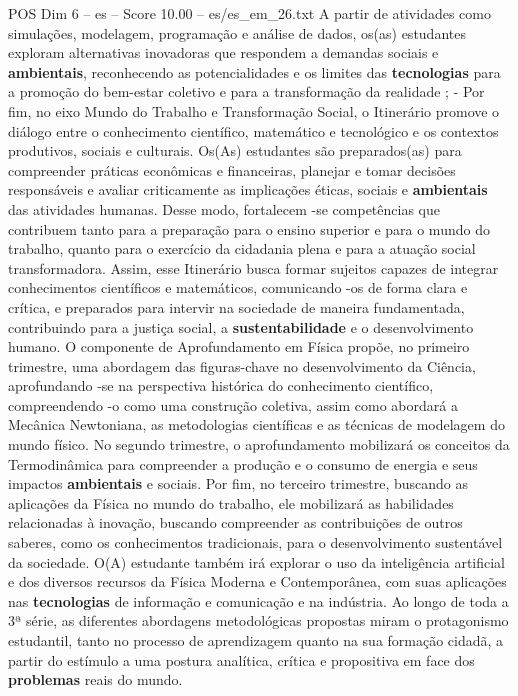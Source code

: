 \begin{textsample}{POS Dim 6 – es – Score 10.00 – es/es\_em\_26.txt}
A partir de atividades como simulações, modelagem, programação e análise de dados, os(as) estudantes exploram alternativas inovadoras que respondem a demandas sociais e \textbf{ambientais}, reconhecendo as potencialidades e os limites das \textbf{tecnologias} para a promoção do bem-estar coletivo e para a transformação da realidade ; - Por fim, no eixo Mundo do Trabalho e Transformação Social, o Itinerário promove o diálogo entre o conhecimento científico, matemático e tecnológico e os contextos produtivos, sociais e culturais.
Os(As) estudantes são preparados(as) para compreender práticas econômicas e financeiras, planejar e tomar decisões responsáveis e avaliar criticamente as implicações éticas, sociais e \textbf{ambientais} das atividades humanas.
Desse modo, fortalecem -se competências que contribuem tanto para a preparação para o ensino superior e para o mundo do trabalho, quanto para o exercício da cidadania plena e para a atuação social transformadora.
Assim, esse Itinerário busca formar sujeitos capazes de integrar conhecimentos científicos e matemáticos, comunicando -os de forma clara e crítica, e preparados para intervir na sociedade de maneira fundamentada, contribuindo para a justiça social, a \textbf{sustentabilidade} e o desenvolvimento humano.
O componente de Aprofundamento em Física propõe, no primeiro trimestre, uma abordagem das figuras-chave no desenvolvimento da Ciência, aprofundando -se na perspectiva histórica do conhecimento científico, compreendendo -o como uma construção coletiva, assim como abordará a Mecânica Newtoniana, as metodologias científicas e as técnicas de modelagem do mundo físico.
No segundo trimestre, o aprofundamento mobilizará os conceitos da Termodinâmica para compreender a produção e o consumo de energia e seus impactos \textbf{ambientais} e sociais.
Por fim, no terceiro trimestre, buscando as aplicações da Física no mundo do trabalho, ele mobilizará as habilidades relacionadas à inovação, buscando compreender as contribuições de outros saberes, como os conhecimentos tradicionais, para o desenvolvimento sustentável da sociedade.
O(A) estudante também irá explorar o uso da inteligência artificial e dos diversos recursos da Física Moderna e Contemporânea, com suas aplicações nas \textbf{tecnologias} de informação e comunicação e na indústria.
Ao longo de toda a 3ª série, as diferentes abordagens metodológicas propostas miram o protagonismo estudantil, tanto no processo de aprendizagem quanto na sua formação cidadã, a partir do estímulo a uma postura analítica, crítica e propositiva em face dos \textbf{problemas} reais do mundo.

\end{textsample}
